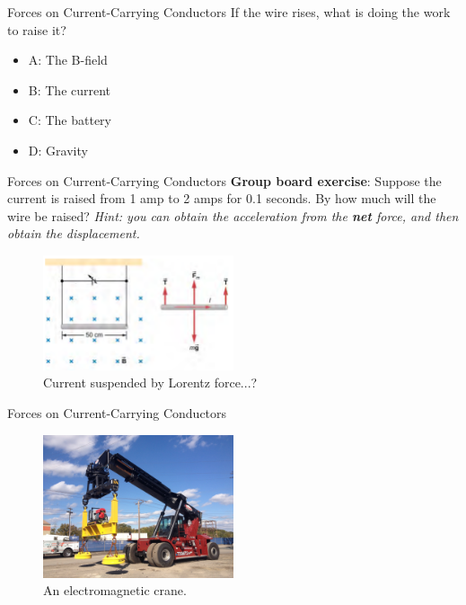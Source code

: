 \documentclass{beamer}
\begin{document}
\begin{frame}{Forces on Current-Carrying Conductors}
If the wire rises, what is doing the work to raise it?
\begin{itemize}
\item A: The B-field
\item B: The current
\item C: The battery
\item D: Gravity
\end{itemize}
\end{frame}

\begin{frame}{Forces on Current-Carrying Conductors}
\small
\textbf{Group board exercise}: Suppose the current is raised from 1 amp to 2 amps for 0.1 seconds.  By how much will the wire be raised?  \textit{Hint: you can obtain the acceleration from the \textbf{net} force, and then obtain the displacement.}
\begin{figure}
\centering
\includegraphics[width=0.5\textwidth]{figures/leads.png}
\caption{\label{fig:leads2} Current suspended by Lorentz force...?}
\end{figure}
\end{frame}

\begin{frame}{Forces on Current-Carrying Conductors}
\begin{figure}
\centering
\includegraphics[width=0.5\textwidth]{figures/crane.jpg}
\caption{\label{fig:crane} An electromagnetic crane.}
\end{figure}
\end{frame}
\end{document}
